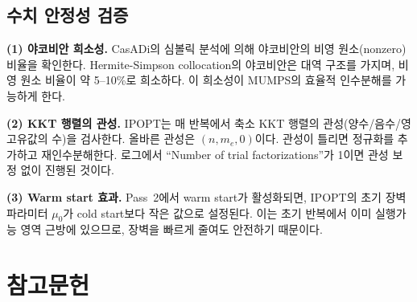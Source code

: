 \documentclass[11pt]{article}
\begin{document}
\subsection{수치 안정성 검증}

\textbf{(1) 야코비안 희소성.} CasADi의 심볼릭 분석에 의해 야코비안의 비영 원소(nonzero) 비율을 확인한다. Hermite-Simpson collocation의 야코비안은 대역 구조를 가지며, 비영 원소 비율이 약 5--10\%로 희소하다. 이 희소성이 MUMPS의 효율적 인수분해를 가능하게 한다.

\textbf{(2) KKT 행렬의 관성.} IPOPT는 매 반복에서 축소 KKT 행렬의 관성(양수/음수/영 고유값의 수)을 검사한다. 올바른 관성은 $(n, m_e, 0)$이다. 관성이 틀리면 정규화를 추가하고 재인수분해한다. 로그에서 ``Number of trial factorizations''가 1이면 관성 보정 없이 진행된 것이다.

\textbf{(3) Warm start 효과.} Pass~2에서 warm start가 활성화되면, IPOPT의 초기 장벽 파라미터 $\mu_0$가 cold start보다 작은 값으로 설정된다. 이는 초기 반복에서 이미 실행가능 영역 근방에 있으므로, 장벽을 빠르게 줄여도 안전하기 때문이다.


\section{참고문헌}
\label{sec:references}



\end{document}
